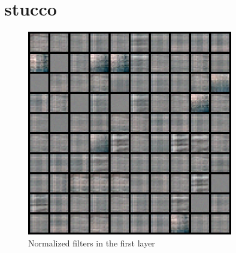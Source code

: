 \documentclass[11pt, oneside]{article}   	%
\begin{document}
\section{stucco}
\begin{figure}[H]
	\centering
	\includegraphics[width=0.8\textwidth]{stucco}
	\caption{Normalized filters in the first layer}
	\label {fig:stuccof}
\end{figure}
\end{document}
